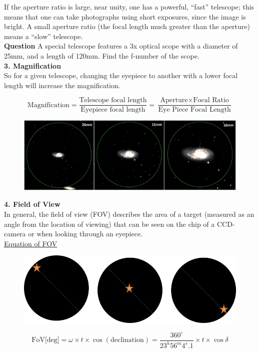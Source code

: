 \documentclass[a4paper,12pt]{extarticle}
\begin{document}
If the aperture ratio is large, near unity, one has a powerful, ``fast'' telescope; this means that one can take photographs using short exposures, since the image is bright. A small aperture ratio (the focal length much greater than the aperture) means a ``slow'' telescope.\\

\textsf{\textbf{Question}} A special telescope features a 3x optical scope  with a diameter of 25mm, and a length of 120mm. Find the f-number of the scope.\\

\textbf{3. Magnification}\\

So for a given telescope, changing the eyepiece to another with a lower focal length will increase the magnification. 

$$\text{Magnification}=\frac{\text{Telescope focal length}}{\text{Eyepiece focal length}}=\frac{\text{Aperture}\times \text{Focal Ratio}}{\text{Eye Piece Focal Length}}$$ 

\begin{figure}[H]
	\centering
	\includegraphics[width=0.9\linewidth]{tel_magnify.png}
\end{figure}

\clearpage 
\textbf{4. Field of View}\\

In general, the field of view (FOV) describes the area of a target (measured as an angle from the location of viewing) that can be seen on the chip of a CCD-camera or when looking through an eyepiece.\\

\underline{\textsf{Equation of FOV}}\\

\begin{figure}[H]
	\centering
	\includegraphics[width=0.9\linewidth]{FOV1.png}
\end{figure}
{\color{red}
	$$\text{FoV[deg]}= \omega \times t \times \cos(\text{declination})=\frac{360^\circ}{23^h56^m4^s.1}\times t\times \cos\delta$$}
\end{document}
